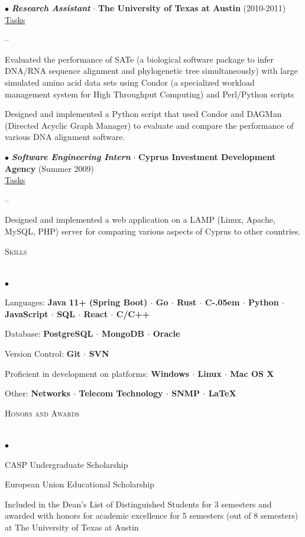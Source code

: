 \documentclass[11pt]{article}
\newcommand{\Csharp}{%
  {\settoheight{\dimen0}{C}C\kern-.05em \resizebox{!}{\dimen0}{\raisebox{\depth}{\#}}}}
\newcommand{\lineunder}{\vspace*{-8pt} \\ \hspace*{-18pt} \hrulefill \\}
\newcommand{\header}[1]{{\hspace*{-15pt}\vspace*{6pt} \textsc{#1}} \vspace*{-6pt} \lineunder}
\newcommand{\employer}[3]{{ \textbf{\emph{#1}} $\cdot$ \textbf{#2} (#3)\\ \vspace{1mm}  }}
\newenvironment{achievements}
{
  \begin{list}{$\bullet$}{\topsep 0pt \itemsep -2pt}}{\vspace*{4pt}\end{list}
}
\newenvironment{tasks}
{
  \underline{Tasks} \vspace{1mm} \begin{list}{--}{\topsep 0pt \itemsep -2pt}}{\vspace*{4pt}\end{list}
}
\begin{document}
\hspace*{-12pt}$\bullet$
\employer{Research Assistant}{The University of Texas at Austin}{2010-2011}
\begin{tasks}
  \item Evaluated the performance of SATe (a biological software package to infer DNA/RNA sequence alignment and phylogenetic tree simultaneously) with large simulated amino acid data sets using Condor (a specialized workload management system for High Throughput Computing) and Perl/Python scripts
  \item Designed and implemented a Python script that used Condor and DAGMan (Directed Acyclic Graph Manager) to evaluate and compare the performance of various DNA alignment software.
\end{tasks}


\hspace*{-12pt}$\bullet$
\employer{Software Engineering Intern}{Cyprus Investment Development Agency}{Summer 2009}
\begin{tasks}
  \item Designed and implemented a web application on a LAMP (Linux, Apache, MySQL, PHP) server for comparing various aspects of Cyprus to other countries.
\end{tasks}


\header{Skills}
\begin{achievements}
  \item Languages: \textbf{Java 11+ (Spring Boot)  $\cdot$ Go  $\cdot$ Rust $\cdot$ \Csharp $\cdot$ Python $\cdot$ JavaScript $\cdot$ SQL $\cdot$ React
    $\cdot$ C/C++ }
  \item Database: \textbf{PostgreSQL  $\cdot$ MongoDB  $\cdot$  Oracle}
  \item Version Control: \textbf{Git $\cdot$ SVN }
  \item Proficient in development on platforms: \textbf{Windows $\cdot$ Linux $\cdot$ Mac OS X}
  \item Other: \textbf{Networks $\cdot$ Telecom Technology $\cdot$ SNMP $\cdot$ \LaTeX}
\end{achievements}

\newpage

\header{Honors and Awards}
\begin{achievements}
  \item CASP Undergraduate Scholarship
  \item European Union Educational Scholarship
  \item Included in the Dean's List of Distinguished Students for 3 semesters and awarded with honors for academic excellence for 5 semesters (out of 8 semesters) at The University of Texas at Austin
\end{achievements}
\end{document}

